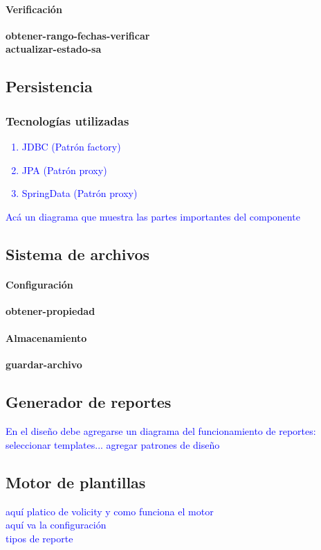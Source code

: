 	\paragraph{Verificación\\}
		\textbf{obtener-rango-fechas-verificar}\\
		\textbf{actualizar-estado-sa}

\subsection{Persistencia}
\subsubsection{Tecnologías utilizadas}
\textcolor{blue}{
\begin{enumerate}
	\item JDBC 			(Patrón factory)
	\item JPA			(Patrón proxy)
	\item SpringData	(Patrón proxy)
\end{enumerate}
}

\textcolor{blue}{
	Acá un diagrama que muestra las partes importantes del componente
}

\subsection{Sistema de archivos}
	\paragraph{Configuración\\}
		\textbf{obtener-propiedad}
	\paragraph{Almacenamiento\\}
		\textbf{guardar-archivo}


\subsection{Generador de reportes}

\textcolor{blue}{En el diseño debe agregarse un diagrama del funcionamiento de reportes: seleccionar templates... agregar patrones de diseño}\\
\subsection{Motor de plantillas}
\textcolor{blue}{aquí platico de volicity y como funciona el motor}\\
\textcolor{blue}{aquí va la configuración}\\
\textcolor{blue}{tipos de reporte}

